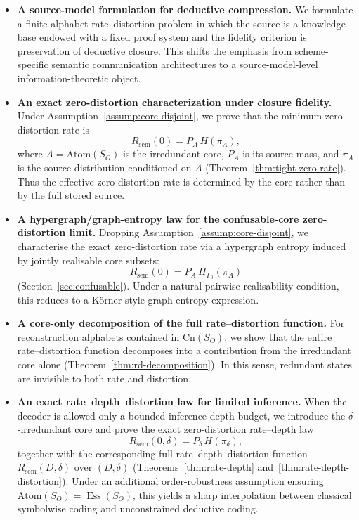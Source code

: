 \documentclass[journal,onecolumn]{IEEEtran}
\newcommand{\Atom}{\text{Atom}}
\newcommand{\Cn}{\text{Cn}}
\newcommand{\Ess}{\operatorname{Ess}}
\numberwithin{equation}{section}
\begin{document}
\begin{itemize}

\item \textbf{A source-model formulation for deductive compression.}
We formulate a finite-alphabet rate--distortion problem in which the source is a knowledge base endowed with a fixed proof system and the fidelity criterion is preservation of deductive closure. This shifts the emphasis from scheme-specific semantic communication architectures to a source-model-level information-theoretic object.

\item \textbf{An exact zero-distortion characterization under closure fidelity.}
Under Assumption~\ref{assump:core-disjoint}, we prove that the minimum zero-distortion rate is
\[
R_{\mathrm{sem}}(0)=P_A\,H(\pi_A),
\]
where \(A=\Atom(S_O)\) is the irredundant core, \(P_A\) is its source mass, and \(\pi_A\) is the source distribution conditioned on \(A\) \textup{(Theorem~\ref{thm:tight-zero-rate})}. Thus the effective zero-distortion rate is determined by the core rather than by the full stored source.

\item \textbf{A hypergraph/graph-entropy law for the confusable-core zero-distortion limit.}
Dropping Assumption~\ref{assump:core-disjoint}, we characterise the exact zero-distortion rate via a hypergraph entropy induced by jointly realisable core subsets:
\[
R_{\mathrm{sem}}(0)=P_A\,H_{\Gamma_0}(\pi_A)
\]
(Section~\ref{sec:confusable}).
Under a natural pairwise realisability condition, this reduces to a K\"orner-style graph-entropy expression.

\item \textbf{A core-only decomposition of the full rate--distortion function.}
For reconstruction alphabets contained in \(\Cn(S_O)\), we show that
the entire rate--distortion function decomposes into a contribution
from the irredundant core alone
\textup{(Theorem~\ref{thm:rd-decomposition})}. In this sense,
redundant states are invisible to both rate and distortion.

\item \textbf{An exact rate--depth--distortion law for limited inference.}
When the decoder is allowed only a bounded inference-depth budget,
we introduce the \(\delta\)-irredundant core and prove the exact
zero-distortion rate--depth law
\[
R_{\mathrm{sem}}(0,\delta)=P_\delta\,H(\pi_\delta),
\]
together with the corresponding full rate--depth--distortion function
\(R_{\mathrm{sem}}(D,\delta)\) over \((D,\delta)\)
\textup{(Theorems~\ref{thm:rate-depth} and~\ref{thm:rate-depth-distortion})}.
Under an additional order-robustness assumption ensuring
\(\Atom(S_O)=\Ess(S_O)\), this yields a sharp interpolation between
classical symbolwise coding and unconstrained deductive coding.


\end{itemize}
\end{document}
